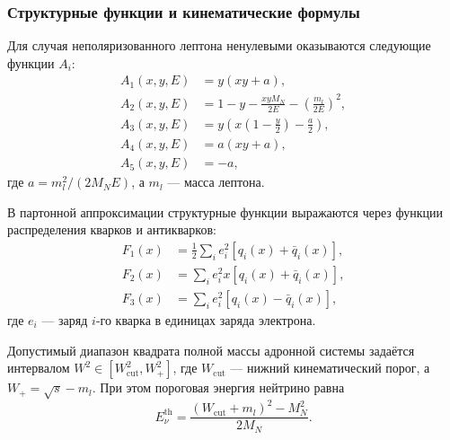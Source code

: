 \subsubsection{Структурные функции и кинематические формулы}
\label{app:structure_functions}

Для случая неполяризованного лептона ненулевыми оказываются следующие функции $A_i$:
\begin{equation}
    \begin{aligned}
        A_1(x, y, E) &= y(xy + a), \\
        A_2(x, y, E) &= 1 - y - \frac{xyM_N}{2E} - \left( \frac{m_{l}}{2E} \right)^2, \\
        A_3(x, y, E) &= y\left( x\left(1 - \frac{y}{2} \right) - \frac{a}{2} \right), \\
        A_4(x, y, E) &= a(xy + a), \\
        A_5(x, y, E) &= -a,
    \end{aligned}
\end{equation}
где $a = m_l^2/(2M_N E)$, а $m_l$ — масса лептона.

В партонной аппроксимации структурные функции выражаются через функции распределения кварков и антикварков:
\begin{equation}
    \begin{aligned}
        F_1(x) &= \frac{1}{2} \sum\limits_{i} e_i^2 \left[ q_i(x) + \bar{q}_i(x) \right], \\
        F_2(x) &= \sum\limits_{i} e_i^2 x \left[ q_i(x) + \bar{q}_i(x) \right], \\
        F_3(x) &= \sum\limits_{i} e_i^2 \left[ q_i(x) - \bar{q}_i(x) \right],
    \end{aligned}
\end{equation}
где $e_i$ — заряд $i$-го кварка в единицах заряда электрона.

Допустимый диапазон квадрата полной массы адронной системы задаётся интервалом $W^2 \in [W^2_{\text{cut}}, W_+^2]$, где $W_{\text{cut}}$ — нижний кинематический порог, а $W_+ = \sqrt{s} - m_l$. При этом пороговая энергия нейтрино равна
\begin{equation}
    E_\nu^{\text{th}} = \frac{(W_{\text{cut}} + m_l)^2 - M_N^2}{2M_N}.
\end{equation}

